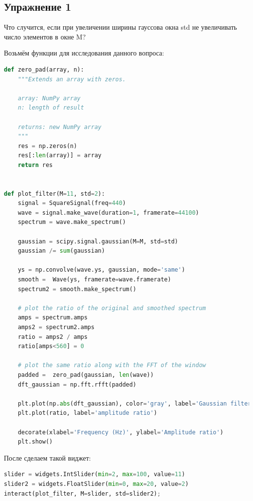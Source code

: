 \subsection{Упражнение 1}

Что случится, если при увеличении ширины гауссова окна std не увеличивать число элементов в окне M?

Возьмём функции для исследования данного вопроса:

\begin{lstlisting}[language=Python]
def zero_pad(array, n):
    """Extends an array with zeros.

    array: NumPy array
    n: length of result

    returns: new NumPy array
    """
    res = np.zeros(n)
    res[:len(array)] = array
    return res


def plot_filter(M=11, std=2):
    signal = SquareSignal(freq=440)
    wave = signal.make_wave(duration=1, framerate=44100)
    spectrum = wave.make_spectrum()

    gaussian = scipy.signal.gaussian(M=M, std=std)
    gaussian /= sum(gaussian)

    ys = np.convolve(wave.ys, gaussian, mode='same')
    smooth =  Wave(ys, framerate=wave.framerate)
    spectrum2 = smooth.make_spectrum()

    # plot the ratio of the original and smoothed spectrum
    amps = spectrum.amps
    amps2 = spectrum2.amps
    ratio = amps2 / amps    
    ratio[amps<560] = 0

    # plot the same ratio along with the FFT of the window
    padded =  zero_pad(gaussian, len(wave))
    dft_gaussian = np.fft.rfft(padded)

    plt.plot(np.abs(dft_gaussian), color='gray', label='Gaussian filter')
    plt.plot(ratio, label='amplitude ratio')

    decorate(xlabel='Frequency (Hz)', ylabel='Amplitude ratio')
    plt.show()
\end{lstlisting}

После сделаем такой виджет:
\begin{lstlisting}[language=Python]
slider = widgets.IntSlider(min=2, max=100, value=11)
slider2 = widgets.FloatSlider(min=0, max=20, value=2)
interact(plot_filter, M=slider, std=slider2);
\end{lstlisting}

